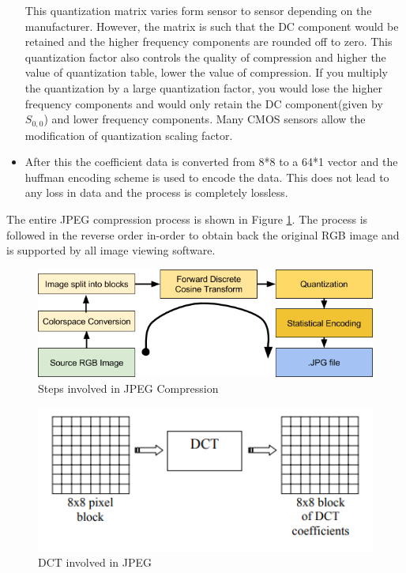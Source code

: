 \begin{itemize}
This quantization matrix varies form sensor to sensor depending on the manufacturer. However, the matrix is such that the DC component would be retained and the higher frequency components are rounded off to zero. This quantization factor also controls the quality of compression and higher the value of quantization table, lower the value of compression. If you multiply the quantization by a large quantization factor, you would lose the higher frequency components and would only retain the DC component(given by $S_{0,0}$) and lower frequency components. Many CMOS sensors allow the modification of quantization scaling factor.
\item After this the coefficient data is converted from 8*8 to a 64*1 vector and the huffman encoding scheme is used to encode the data. This does not lead to any loss in data and the process is completely lossless.
\end{itemize}
The entire JPEG compression process is shown in Figure \ref{fig:jpeg}. The process is followed in the reverse order in-order to obtain back the original RGB image and is supported by all image viewing software.

\begin{figure}[]
\centering
\includegraphics[scale=0.50]{pics/jpegcompression.png}
\caption{Steps involved in JPEG Compression\cite{Jpeg}}
\label{fig:jpeg}
\end{figure}

\begin{figure}[]
\centering
\includegraphics[scale=1]{pics/dct.PNG}
\caption{DCT involved in JPEG\cite{dct}}
\label{fig:dct}
\end{figure}
